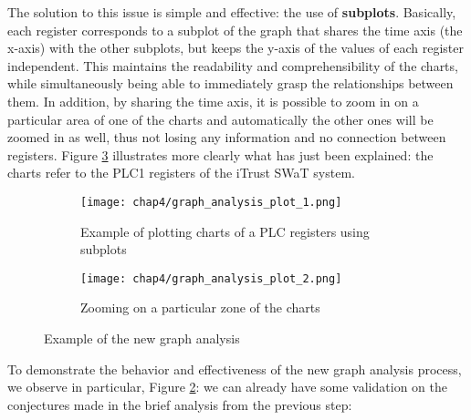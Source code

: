 \bigskip
The solution to this issue is simple and effective: the use of \textbf{subplots}. Basically, each register corresponds to a subplot of the graph that shares the time axis (the x-axis) with the other subplots, but keeps the y-axis of the values of each register independent. This maintains the readability and comprehensibility of the charts, while simultaneously being able to immediately grasp the relationships between them. In addition, by sharing the time axis, it is possible to zoom in on a particular area of one of the charts and automatically the other ones will be zoomed in as well, thus not losing any information and no connection between registers. Figure \ref{fig:4_graph_analysis} illustrates more clearly what has just been explained: the charts refer to the PLC1 registers of the iTrust SWaT system.

\begin{figure}[H]
	\centering
	\begin{subfigure}{0.9\textwidth}
		\texttt{[image: chap4/graph\_analysis\_plot\_1.png]}
		\caption{Example of plotting charts of a PLC registers using subplots}
		\label{subfig:4_graph_analysis_1}
	\end{subfigure}
	\hfill
	\begin{subfigure}{0.9\textwidth}
		\texttt{[image: chap4/graph\_analysis\_plot\_2.png]}
		\caption{Zooming on a particular zone of the charts}
		\label{subfig:4_graph_analysis_2}
	\end{subfigure}
	\caption{Example of the new graph analysis}
	\label{fig:4_graph_analysis}
\end{figure}

\bigskip
To demonstrate the behavior and effectiveness of the new graph analysis process, we observe in particular, Figure \ref{subfig:4_graph_analysis_2}: we can already have some validation on the conjectures made in the brief analysis from the previous step:

